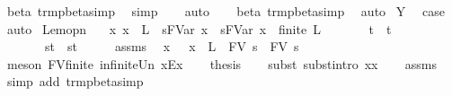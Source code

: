 \begin{isabellebody}
\ beta\ trm{\isacharunderscore}pbeta{\isacharunderscore}simp{}\ \isamarkupfalse%
\ simp\isanewline
\ \ \isamarkupfalse%
\ auto{\isacharbrackleft}{}{\isacharbrackright}\isanewline
\ \ \isamarkupfalse%
\ beta\ trm{\isacharunderscore}pbeta{\isacharunderscore}simp{}\ \isamarkupfalse%
\ auto\isanewline
{}\isamarkupfalse%
\isanewline
{}\isamarkupfalse%
\ Y\ \isamarkupfalse%
\ {\isacharquery}case\ \isamarkupfalse%
\ auto\isanewline
{}\isamarkupfalse%
%
\endisatagproof
{\isafoldproof}%
%
\isadelimproof
\isanewline
%
\endisadelimproof
\isanewline
{}\isamarkupfalse%
\ Lem{}{\isacharunderscore}{}{\isacharunderscore}{}opn{\isacharcolon}\isanewline
\ \ \ {\isachardoublequoteopen}{\isasymAnd}x{\isachardot}\ x\ {\isasymnotin}\ L\ {\isasymLongrightarrow}\ s{\isacharcircum}FVar\ x\ {\isasymggreater}\ s{\isacharprime}{\isacharcircum}FVar\ x{\isachardoublequoteclose}\ \ {\isachardoublequoteopen}finite\ L{\isachardoublequoteclose}\isanewline
\ \ \ \ \ \ \ {\isachardoublequoteopen}t\ {\isasymggreater}\ t{\isacharprime}{\isachardoublequoteclose}\isanewline
\ \ \ \ \ \ \ {\isachardoublequoteopen}s{\isacharcircum}t\ {\isasymggreater}\ s{\isacharprime}{\isacharcircum}t{\isacharprime}{\isachardoublequoteclose}\isanewline
%
\isadelimproof
%
\endisadelimproof
%
\isatagproof
{}\isamarkupfalse%
\ {\isacharminus}\isanewline
\ \ \isamarkupfalse%
\ assms{\isacharparenleft}{}{\isacharparenright}\ \isamarkupfalse%
\ x\ \ {}{\isacharcolon}\ {\isachardoublequoteopen}x\ {\isasymnotin}\ L\ {\isasymunion}\ FV\ s\ {\isasymunion}\ FV\ s{\isacharprime}{\isachardoublequoteclose}\ \isamarkupfalse%
\ {\isacharparenleft}meson\ FV{\isacharunderscore}finite\ infinite{\isacharunderscore}Un\ x{\isacharunderscore}Ex{\isacharparenright}\isanewline
\ \ \isamarkupfalse%
\ {\isacharquery}thesis\isanewline
\ \ \isamarkupfalse%
\ {\isacharparenleft}subst\ subst{\isacharunderscore}intro{}{\isacharbrackleft}\ x{\isacharequal}x{\isacharbrackright}{\isacharparenright}\isanewline
\ \ \isamarkupfalse%
\ assms{\isacharparenleft}{}{\isacharparenright}\ \isamarkupfalse%
\ {\isacharparenleft}simp\ add{\isacharcolon}\ trm{\isacharunderscore}pbeta{\isacharunderscore}simp{}{\isacharparenright}\isanewline

\end{isabellebody}
